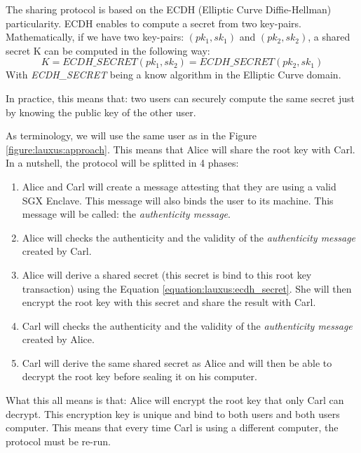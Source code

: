 \documentclass[../main.tex]{subfiles}
\begin{document}
\medbreak
\par The sharing protocol is based on the ECDH (Elliptic Curve Diffie-Hellman) particularity. ECDH enables to compute a secret from two key-pairs. Mathematically, if we have two key-pairs: $(pk_1, sk_1)$ and $(pk_2, sk_2)$, a shared secret K can be computed in the following way:
\begin{equation}
    \label{equation:lauxus:ecdh_secret}
    K = ECDH\_SECRET(pk_1, sk_2) = ECDH\_SECRET(pk_2, sk_1)
\end{equation}
With \textit{ECDH\_SECRET} being a know algorithm in the Elliptic Curve domain.
\par In practice, this means that: two users can securely compute the same secret just by knowing the public key of the other user.


\medbreak
\par As terminology, we will use the same user as in the Figure \ref{figure:lauxus:approach}. This means that Alice will share the root key with Carl. In a nutshell, the protocol will be splitted in 4 phases:
\begin{enumerate}
    \item Alice and Carl will create a message attesting that they are using a valid SGX Enclave. This message will also binds the user to its machine. This message will be called: the \textit{authenticity message}.
    \item Alice will checks the authenticity and the validity of the \textit{authenticity message} created by Carl.
    \item Alice will derive a shared secret (this secret is bind to this root key transaction) using the Equation \ref{equation:lauxus:ecdh_secret}. She will then encrypt the root key with this secret and share the result with Carl.
    \item Carl will checks the authenticity and the validity of the \textit{authenticity message} created by Alice.
    \item Carl will derive the same shared secret as Alice and will then be able to decrypt the root key before sealing it on his computer.
\end{enumerate}
\par What this all means is that: Alice will encrypt the root key that only Carl can decrypt. This encryption key is unique and bind to both users and both users computer. This means that every time Carl is using a different computer, the protocol must be re-run.
\end{document}
